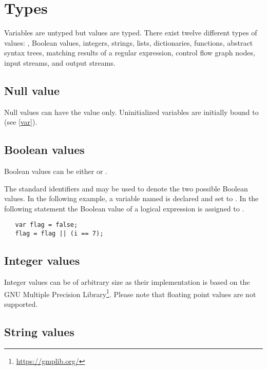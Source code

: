 \chapter{Types}

Variables are untyped but values are typed. There exist twelve different
types of values: , Boolean values, integers, strings,
lists, dictionaries, functions, abstract syntax trees, matching
results of a regular expression, control flow graph nodes, input
streams, and output streams.

\section{Null value}\label{null}

Null values can have the value  only.
Uninitialized variables are initially bound to 
(see \ref{var}).

\section{Boolean values}

Boolean values can be either  or .

The standard identifiers  and 
may be used to denote the two possible Boolean values. In
the following example, a variable named  is
declared and set to . In the following statement
the Boolean value of a logical expression is assigned to .

\begin{lstlisting}
   var flag = false;
   flag = flag || (i == 7);
\end{lstlisting}

\section{Integer values}\label{integer}

Integer values can be of arbitrary size as their
implementation is based on the GNU Multiple Precision
Library\footnote{\url{https://gmplib.org/}}. Please note that floating point values
are not supported.

\section{String values}\label{string}

